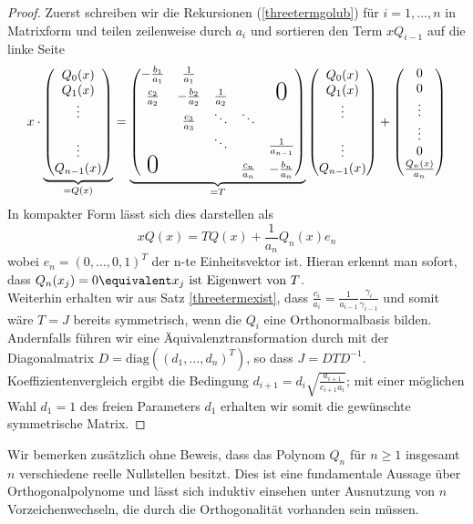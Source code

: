 \begin{proof}
Zuerst schreiben wir die Rekursionen (\ref{threetermgolub}) für $i=1,\dots,n$ in Matrixform und teilen zeilenweise durch $a_i$ und sortieren den Term $xQ_{i-1}$ auf die linke Seite
\begin{equation*}
x\cdot
\underbrace{\begin{pmatrix}Q_0(x)\\ Q_1(x) \\ \vdots \\ \\ \vdots \\ Q_{n-1}(x)\end{pmatrix}}_{=Q(x)}
=\underbrace{\begin{pmatrix}
-\frac{b_1}{a_1} & \frac{1}{a_1} &  &  &  \\ 
\frac{c_2}{a_2} & -\frac{b_2}{a_2} & \frac{1}{a_2} & & \text{\huge0} \\ 
 & \frac{c_3}{a_3} & \ddots & \ddots &  \\ 
 &  & \ddots & & \frac{1}{a_{n-1}} \\
\text{\huge0} &  &  & \frac{c_n}{a_n} & -\frac{b_n}{a_n}
\end{pmatrix}}_{=T}
\begin{pmatrix}Q_0(x)\\ Q_1(x) \\ \vdots \\ \\ \vdots \\ Q_{n-1}(x)\end{pmatrix} 
+\begin{pmatrix}0 \\ 0 \\ \vdots \\ \vdots \\ 0 \\ \frac{Q_{n}(x)}{a_n}\end{pmatrix} 
\end{equation*}
In kompakter Form lässt sich dies darstellen als
\[xQ(x)=TQ(x)+\frac{1}{a_n}Q_n(x)e_n\]
wobei $e_n=(0,\dots,0,1)^T$ der n-te Einheitsvektor ist. Hieran erkennt man sofort, dass $Q_n(x_j)=0\equivalent x_j\text{ ist Eigenwert von }T$.\\
Weiterhin erhalten wir aus Satz \ref{threetermexist}, dass $\frac{c_i}{a_i}=\frac{1}{a_{i-1}}\frac{\gamma_i}{\gamma_{i-1}}$ und somit wäre $T=J$ bereits symmetrisch, wenn die $Q_i$ eine Orthonormalbasis bilden.\\
Andernfalls führen wir eine Äquivalenztransformation durch mit der Diagonalmatrix $D=\text{diag}\left((d_1,\dots,d_n)^T\right)$, so dass $J=DTD^{-1}$. Koeffizientenvergleich ergibt die Bedingung $d_{i+1}=d_i\sqrt{\frac{a_{i+1}}{c_{i+1}a_i}}$; mit einer möglichen Wahl $d_1=1$ des freien Parameters $d_1$ erhalten wir somit die gewünschte symmetrische Matrix.
\end{proof}
Wir bemerken zusätzlich ohne Beweis, dass das Polynom $Q_n$ für $n\ge 1$ insgesamt $n$ verschiedene reelle Nullstellen besitzt. Dies ist eine fundamentale Aussage über Orthogonalpolynome und lässt sich induktiv einsehen unter Ausnutzung von $n$ Vorzeichenwechseln, die durch die Orthogonalität vorhanden sein müssen.

